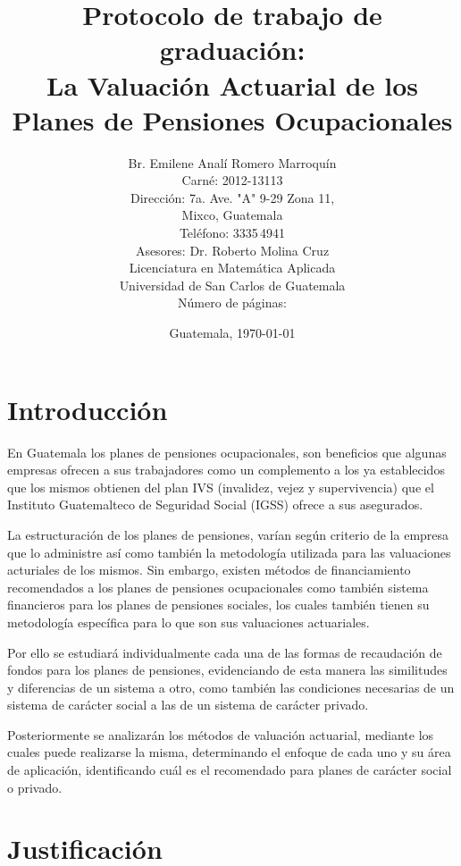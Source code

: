 \documentclass[12pt,letterpaper,titlepage]{article}
\title{Protocolo de trabajo de graduación:\\
La Valuación Actuarial de los Planes de Pensiones Ocupacionales}
\author{Br. Emilene Analí Romero Marroquín\\Carné: 2012-13113\\Dirección: 7a. Ave. "A" 9-29 Zona 11,\\Mixco, Guatemala\\Teléfono: 3335\,4941\\Asesores: Dr. Roberto Molina Cruz\\Licenciatura en Matemática Aplicada\\Universidad de San Carlos de Guatemala\\Número de páginas: \pageref{fin}}
\date{Guatemala, \today}
\begin{document}
\begin{titlepage}
\renewcommand{\thepage}{}
\pagestyle{empty}
\maketitle
\end{titlepage}\newpage
\setcounter{page}{2}
\tableofcontents
\newpage
\nocite{*}
\section{Introducción}

En Guatemala los planes de pensiones ocupacionales, son beneficios que algunas empresas ofrecen a sus trabajadores como un complemento a los ya establecidos que los mismos obtienen del plan IVS (invalidez, vejez y supervivencia) que el Instituto Guatemalteco de Seguridad Social (IGSS) ofrece a sus asegurados. 

La estructuración de los planes de pensiones, varían según criterio de la empresa que lo administre así como también la metodología utilizada para las valuaciones acturiales de los mismos. Sin embargo, existen métodos de financiamiento recomendados a los planes de pensiones ocupacionales como también sistema financieros para los planes de pensiones sociales, los cuales también tienen su metodología específica para lo que son sus valuaciones actuariales.

Por ello se estudiará individualmente cada una de las formas de recaudación de fondos para los planes de pensiones, evidenciando de esta manera las similitudes y diferencias de un sistema a otro, como también las condiciones necesarias de un sistema de carácter social a las de un sistema de carácter privado.

Posteriormente se analizarán los métodos de valuación actuarial, mediante los cuales puede realizarse la misma, determinando el enfoque de cada uno y su área de aplicación, identificando cuál es el recomendado para planes de carácter social o privado.




\newpage

\section{Justificación}
\end{document}
